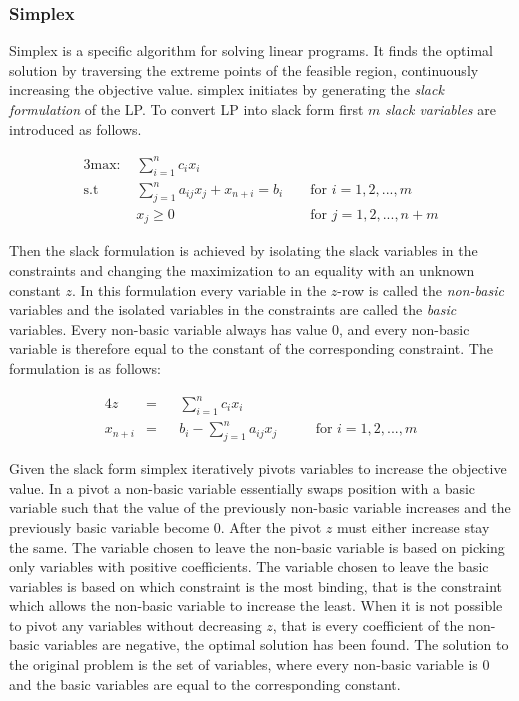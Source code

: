 \subsubsection{Simplex}
Simplex is a specific algorithm for solving linear programs. It finds the optimal solution by traversing the extreme points of the feasible region, continuously increasing the objective value.
simplex initiates by generating the \textit{slack formulation} of the LP. To convert LP into slack form first $m$ \textit{slack variables} are introduced as follows.

\begin{alignat}{3}
\text{max: } &\sum_{i=1}^{n} c_i x_i\\
\text{s.t }  & \sum_{j=1}^{n} a_{ij} x_j + x_{n+i} = b_i  && \text{ for } i=1,2,...,m\\
& x_j \geq 0                                    && \text{ for } j=1,2,...,n+m
\end{alignat}

Then the slack formulation is achieved by isolating the slack variables in the constraints and changing the maximization to an equality with an unknown constant $z$. In this formulation every variable in the $z$-row is called the \textit{non-basic} variables and the isolated variables in the constraints are called the \textit{basic} variables. Every non-basic variable always has value 0, and every non-basic variable is therefore equal to the constant of the corresponding constraint. The formulation is as follows:

\begin{alignat}{4}
z        &= && \sum_{i=1}^{n} c_ix_i\\
x_{n+i}  &= && b_i - \sum_{j=1}^{n} a_{ij} x_j  &&& \text{ for } i=1,2,...,m
\end{alignat}

Given the slack form simplex iteratively pivots variables to increase the objective value. In a pivot a non-basic variable essentially swaps position with a basic variable such that the value of the previously non-basic variable increases and the previously basic variable become $0$. After the pivot $z$ must either increase stay the same. The variable chosen to leave the non-basic variable is based on picking only variables with positive coefficients. The variable chosen to leave the basic variables is based on which constraint is the most binding, that is the constraint which allows the non-basic variable to increase the least. When it is not possible to pivot any variables without decreasing $z$, that is every coefficient of the non-basic variables are negative, the optimal solution has been found. The solution to the original problem is the set of variables, where every non-basic variable is $0$ and the basic variables are equal to the corresponding constant.

